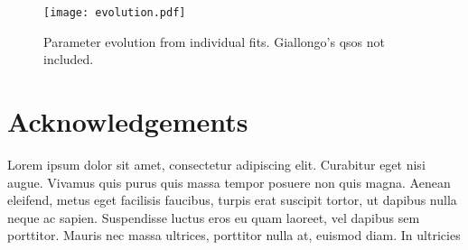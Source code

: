 \documentclass[a4paper,fleqn,usenatbib]{mnras}
\begin{document}
\begin{figure*}
  \begin{center}
    \texttt{[image: evolution.pdf]}
  \end{center}
  \caption{Parameter evolution from individual fits.  Giallongo's qsos not included.}
\end{figure*}


\section*{Acknowledgements}

Lorem ipsum dolor sit amet, consectetur adipiscing elit. Curabitur
eget nisi augue. Vivamus quis purus quis massa tempor posuere non quis
magna. Aenean eleifend, metus eget facilisis faucibus, turpis erat
suscipit tortor, ut dapibus nulla neque ac sapien. Suspendisse luctus
eros eu quam laoreet, vel dapibus sem porttitor. Mauris nec massa
ultrices, porttitor nulla at, euismod diam. In ultricies





\bsp
\label{lastpage}
\end{document}
